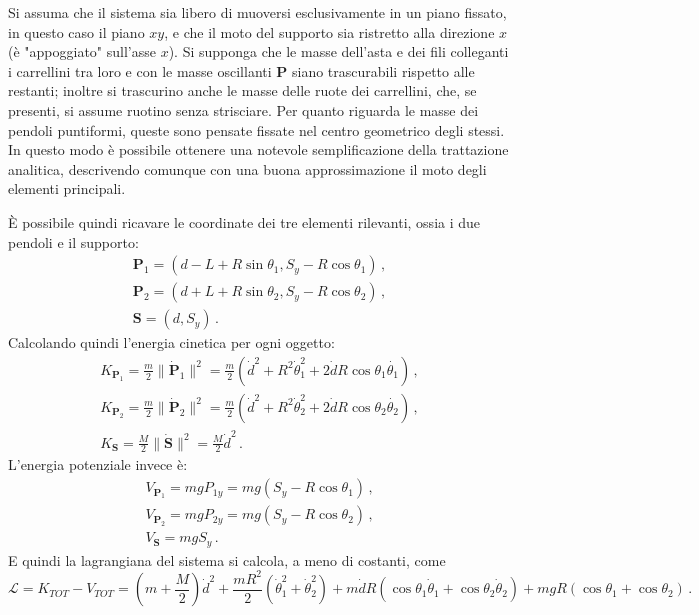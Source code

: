 \documentclass[11pt, a4paper, twoside, italian]{article}
\begin{document}
Si assuma che il sistema sia libero di muoversi esclusivamente in un piano fissato, in questo caso
il piano $xy$, e che il moto del supporto sia ristretto alla direzione $x$ (è "appoggiato" sull'asse $x$).
Si supponga che le masse dell'asta e dei fili colleganti i carrellini tra loro
e con le masse oscillanti $\mathbf{P}$ siano trascurabili rispetto alle restanti; 
inoltre si trascurino anche le masse delle ruote dei carrellini, che, se presenti, si assume ruotino senza strisciare.
Per quanto riguarda le masse dei pendoli puntiformi, queste sono pensate fissate nel centro geometrico degli stessi.
In questo modo è possibile ottenere una notevole semplificazione della trattazione analitica,
descrivendo comunque con una buona approssimazione il moto degli elementi principali.

È possibile quindi ricavare le coordinate dei tre elementi rilevanti, ossia i due pendoli e il supporto:
\begin{gather*}
\mathbf{P}_1 = (d - L + R \sin \theta_1, S_y - R \cos \theta_1 ) \, , \\
\mathbf{P}_2 = (d + L + R \sin \theta_2, S_y - R \cos \theta_2 ) \, , \\
\mathbf{S} = (d , S_y) \, .
\end{gather*}
Calcolando quindi l'energia cinetica per ogni oggetto:
\begin{gather*}
K_{\mathbf{P}_1}=  \frac{m}{2} \lVert \dot{\mathbf{P}}_1 \rVert^2 =  \frac{m}{2}(\dot{d}^2 + R^2 \dot\theta_1^2+ 2\dot{d}R\cos\theta_1 \dot{\theta_1}) \, , \\
K_{\mathbf{P}_2} = \frac{m}{2} \lVert \dot{\mathbf{P}}_2 \rVert^2 =  \frac{m}{2}(\dot{d}^2 + R^2 \dot\theta_2^2+ 2\dot{d}R\cos\theta_2 \dot{\theta_2}) \, , \\
K_{\mathbf{S}} =  \frac{M}{2} \lVert \dot{\mathbf{S}} \rVert^2 = \frac{M}{2} \dot{d}^2 \, .
\end{gather*}
L'energia potenziale invece è:
\begin{gather*}
V_{\mathbf{P}_1}= mg P_{1y} = mg (S_y - R \cos \theta_1 ) \, , \\
V_{\mathbf{P}_2} = mg P_{2y} = mg (S_y - R \cos \theta_2 ) \, , \\
V_{\mathbf{S}} = mg S_{y} \, .
\end{gather*}
E quindi la lagrangiana del sistema si calcola, a meno di costanti, come
\begin{equation*}
\mathcal{L} = K_{TOT} - V_{TOT} = \left(m+ \frac{M}{2}\right) \dot{d}^2 + \frac{m R^2}{2}  (\dot\theta_1^2 + \dot\theta_2^2) + m \dot{d} R (\cos\theta_1 \dot\theta_1 + \cos \theta_2 \dot \theta_2) + mgR(\cos\theta_1 + \cos \theta_2) \, .
\end{equation*}
\end{document}
